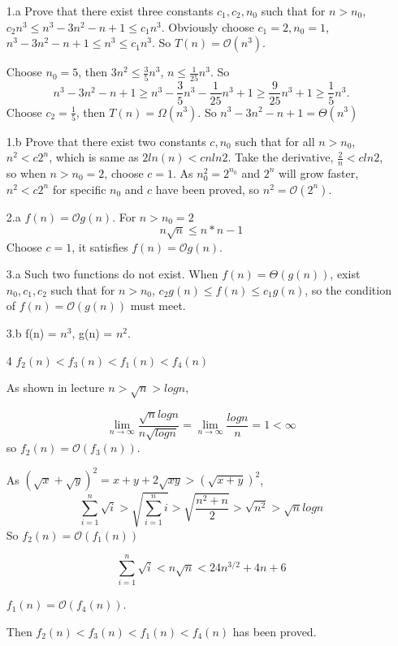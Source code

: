 \documentclass{assignment}
\begin{document}
    \maketitle

    \newpage

    \begin{homeworkProblem}
	\begin{enumerate}
	\item[1.a] Prove that there exist three constants $c_1, c_2, n_0$ such that for $n>n_0$, $c_2 n^3\leq n^3-3n^2-n+1 \leq c_1n^3 $. Obviously choose $c_1 = 2, n_0 = 1$,  $n^3-3n^2-n+1 \leq n^3 \leq c_1n^3 $. So $T(n) = \mathcal{O}(n^3)$.
	
	Choose $n_0 = 5$, then $3n^2 \leq \frac{3}{5}n^3$, $n \leq \frac{1}{25}n^3$. So $$n^3-3n^2-n+1 \geq n^3 - \frac{3}{5}n^3 - \frac{1}{25}n^3 + 1 \geq \frac{9}{25}n^3 + 1 \geq \frac{1}{5}n^3.$$
Choose $c_2 = \frac{1}{5}$, then $T(n) = \Omega(n^3)$. So  
	$n^3-3n^2-n+1 = \Theta(n^3)$
	\item[1.b] Prove that there exist two constants $c, n_0$ such that for all $n > n_0$, $n^2 < c 2^n$, which is same as $2ln(n) < cnln2$. Take the derivative, $
	\frac{2}{n} < cln2$, so when $n > n_0 = 2$, choose $c = 1$. As $n_0^2 = 2^{n_0}$ and $2^n$ will grow faster, $n^2 < c 2^n$ for specific $n_0$ and $c$ have been proved, so $n^2 = \mathcal{O}(2^n)$.
	
	\item[2.a] $f(n) = \mathcal{O}g(n)$. For $n > n_0 = 2$
	$$n\sqrt{n} \leq n*n - 1$$
	Choose $c = 1$, it satisfies $f(n) = \mathcal{O}g(n)$.
	
	\item[3.a] Such two functions do not exist. When $f(n) = \Theta(g(n))$, exist$n_0, c_1, c_2$ such that for $n > n_0$, $c_2g(n) \leq f(n) \leq c_1 g(n)$, so the condition of $f(n) = \mathcal{O}(g(n))$ must meet.
	\item[3.b] f(n) = $n^3$, g(n) = $n^2$.
	
	\item[4] $f_2(n) < f_3(n) < f_1(n) < f_4(n)$
	
	As shown in lecture $n > \sqrt{n} > logn$, 
	
	\begin{equation*}
	\lim_{n \to \infty} \frac{\sqrt{n}logn}{n \sqrt{logn}} =\lim_{n \to \infty} \frac{logn}{n}
	= 1 < \infty
	\end{equation*}
	so $f_2(n) = \mathcal{O}(f_3(n))$.
	
	As $(\sqrt{x} + \sqrt{y})^2 = x + y + 2\sqrt{xy} > (\sqrt{x + y})^2$, 
	$$\sum_{i=1}^n \sqrt{i} > \sqrt{\sum_{i=1}^n i}> \sqrt{\frac{n^2+n}{2}} > \sqrt{n^2} > \sqrt{n}logn$$
	So $f_2(n) = \mathcal{O}(f_1(n))$
	
	$$\sum_{i=1}^n \sqrt{i} < n\sqrt{n} < 24n^{3/2} + 4n + 6$$
	
	$f_1(n) = \mathcal{O}(f_4(n))$. 
	
	Then $f_2(n) < f_3(n) < f_1(n) < f_4(n)$ has been proved. 
	\end{enumerate}
    	
    \end{homeworkProblem}
    
\end{document}
